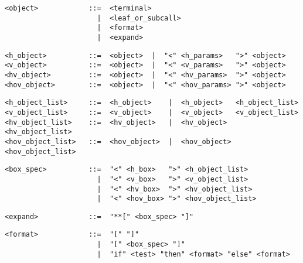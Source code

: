 \begin{small}\begin{verbatim}
<object>            ::=  <terminal>
                      |  <leaf_or_subcall>
                      |  <format>
                      |  <expand>
\end{verbatim}\end{small}

\begin{small}\begin{verbatim}
<h_object>          ::=  <object>  |  "<" <h_params>   ">" <object>
<v_object>          ::=  <object>  |  "<" <v_params>   ">" <object>
<hv_object>         ::=  <object>  |  "<" <hv_params>  ">" <object>
<hov_object>        ::=  <object>  |  "<" <hov_params> ">" <object>
\end{verbatim}\end{small}

\begin{small}\begin{verbatim}
<h_object_list>     ::=  <h_object>    |  <h_object>   <h_object_list>
<v_object_list>     ::=  <v_object>    |  <v_object>   <v_object_list>
<hv_object_list>    ::=  <hv_object>   |  <hv_object>  <hv_object_list>
<hov_object_list>   ::=  <hov_object>  |  <hov_object> <hov_object_list>
\end{verbatim}\end{small}

\begin{small}\begin{verbatim}
<box_spec>          ::=  "<" <h_box>   ">" <h_object_list>
                      |  "<" <v_box>   ">" <v_object_list>
                      |  "<" <hv_box>  ">" <hv_object_list>
                      |  "<" <hov_box> ">" <hov_object_list>
\end{verbatim}\end{small}

\begin{small}\begin{verbatim}
<expand>            ::=  "**[" <box_spec> "]"
\end{verbatim}\end{small}

\begin{small}\begin{verbatim}
<format>            ::=  "[" "]"
                      |  "[" <box_spec> "]"
                      |  "if" <test> "then" <format> "else" <format>
\end{verbatim}\end{small}

